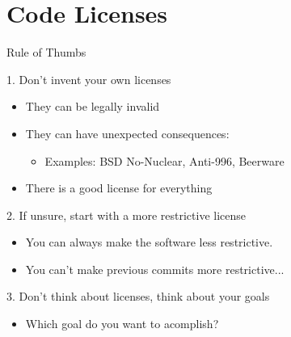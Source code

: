 \documentclass[compress,aspectratio=169]{beamer}
\begin{document}
  \section{Code Licenses}

  \begin{frame}{Rule of Thumbs}
    \pause
    \begin{block}{1. Don't invent your own licenses}
      \begin{itemize}
        \item They can be legally invalid
        \item They can have unexpected consequences:
          \begin{itemize}
            \item Examples: BSD No-Nuclear, Anti-996, Beerware
          \end{itemize}
        \item There is a good license for everything
      \end{itemize}
    \end{block}
    \pause
    \begin{block}{2. If unsure, start with a more restrictive license}
      \begin{itemize}
        \item You can always make the software less restrictive.\\
        \item You can't make previous commits more restrictive...
      \end{itemize}
    \end{block}
    \pause
    \begin{block}{3. Don't think about licenses, think about your goals}
      \begin{itemize}
        \item Which goal do you want to acomplish?
      \end{itemize}
    \end{block}
  \end{frame}
\end{document}
